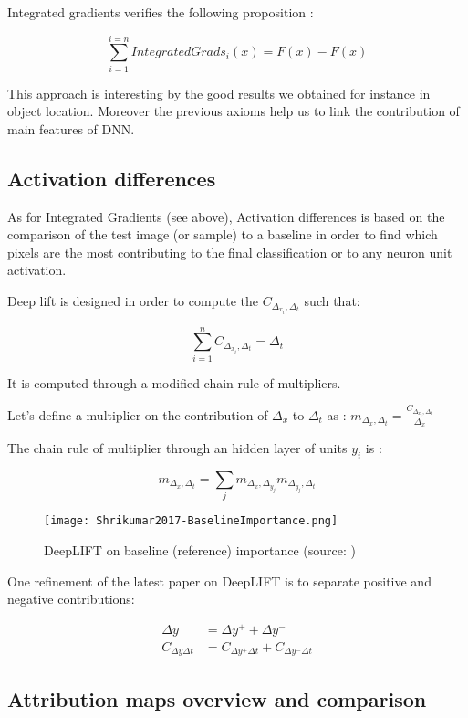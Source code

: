 Integrated gradients verifies the following proposition : 

\[\sum_{i=1}^{i=n} IntegratedGrads_i(x) = F(x) - F(x) \]

This approach is interesting by the good results we obtained for instance in object location. Moreover the previous axioms help us to link the contribution of main features of DNN.

\subsection{Activation differences}
\cite{Shrikumar2017}

As for Integrated Gradients (see above), Activation differences is based on the comparison of the test image (or sample) to a baseline in order to find which pixels are the most contributing to the final classification or to any neuron unit activation.

Deep lift is designed in order to compute the \(C_{\Delta_{x_i},\Delta_{t}}\) such that:

\[ \sum_{i=1}^n C_{\Delta_{x_i},\Delta_{t}} = \Delta_t\]

It is computed through a modified chain rule of multipliers.

Let's define a multiplier on the contribution of \(\Delta_x\) to \(\Delta_t\) as : 
\(m_{\Delta_{x},\Delta_{t}} = \frac{C_{\Delta_{x_i},\Delta_{t}}}{\Delta_x} \)

The chain rule of multiplier through an hidden layer of units \(y_i\) is :

\[ m_{\Delta_{x},\Delta_{t}} = \sum_j m_{\Delta_{x},\Delta_{y_j}} m_{\Delta_{y_j},\Delta_{t}}  \]

\begin{figure}
    \centering
    \texttt{[image: Shrikumar2017-BaselineImportance.png]}
    \caption{DeepLIFT on baseline (reference) importance (source: \cite{Shrikumar2017})}
    \label{fig:deeplift-baseline}
\end{figure}

One refinement of the latest paper on DeepLIFT is to separate positive and negative contributions:

\[\begin{aligned} \Delta y &=\Delta y^{+}+\Delta y^{-} \\ C_{\Delta y \Delta t} &=C_{\Delta y^{+} \Delta t}+C_{\Delta y^{-} \Delta t} \end{aligned}\]
 

\subsection{Attribution maps overview and comparison}

